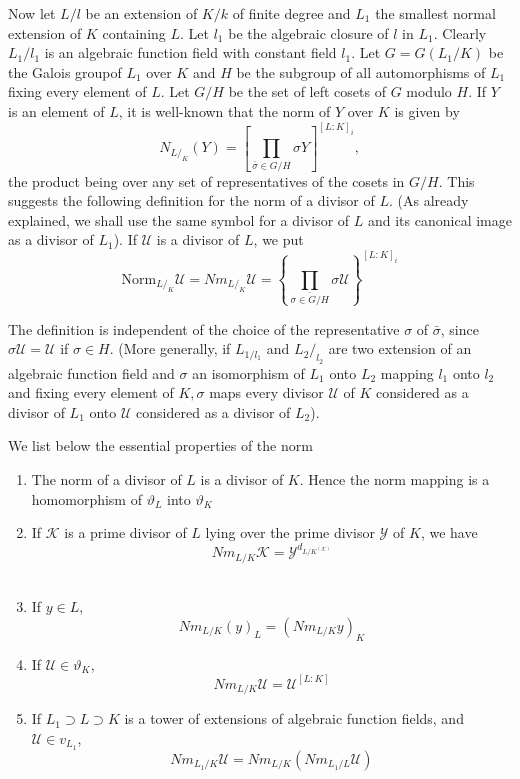 Now let $L/l$ be an extension of $K/ k$ of finite degree and $L_1$
the smallest normal extension of $K$ containing $L$. Let $l_1$ be the
algebraic closure of $l$ in $L_1$. Clearly  $L_1 / l_1$ is an
algebraic function field with constant field $l_1$. Let $G= G(L_1/K)$
be the Galois group\pageoriginale of $L_1$ over $K$ and $H$ be the subgroup of all
automorphisms of $L_1$ fixing every element of $L$. Let $G/H$ be the
set of left cosets of $G$ modulo $H$. If $Y$ is an element of $L$, it
is well-known that the norm of $Y$ over $K$ is given by 
$$
N_{L / _K}(Y) = \left[ \prod_{\bar{\sigma} \in G/ H} \sigma Y
  \right]^{[L : K]_i}, 
$$
the product being over any set of representatives of the cosets in $G
/H$. This suggests the following definition for the norm of a divisor
of $L$. (As already explained, we shall use the same symbol for a
divisor of $L$ and its canonical image as a divisor of $L_1$).  If
$\mathscr{U}$ is a divisor of $L$, we put  
$$
\text{Norm}_{L /_K} \mathscr{U} =Nm_{L / _K}\mathscr{U} =
\left\{\prod_{\bar{\sigma \in G/ H}} \sigma \mathscr{U} \right\}^{[L :K]_i} 
$$

The definition is independent of the choice of the representative
$\sigma$ of $\bar{\sigma}$, since $\sigma \mathscr{U}= \mathscr{U}$ if
$\sigma \in H$. (More generally, if  $L_{1/ l_1}$ and $L_2 /_{l_2}$
are two extension of an algebraic function field and $\sigma$ an
isomorphism of $L_1$ onto $L_2$ mapping $l_1$ onto $l_2$ and fixing
every element of $K, \sigma$ maps every divisor $\mathscr{U}$ of $K$
considered as a divisor of $L_1$ onto $\mathscr{U}$ considered as a
divisor of $L_2$). 

We list below the essential properties of the norm 
\begin{enumerate}
\item The norm of a divisor of $L$ is a divisor of $K$. Hence the norm
  mapping is a homomorphism of $\vartheta_L$ into $\vartheta_K$  
\item If $\mathscr{K}$ is a prime divisor of $L$ lying over the prime
  divisor $\mathscr{Y}$ of $K$, we have  
  $$
  Nm_{L /K}\mathscr{K} = \mathscr{Y}^{d_{L/ K ^{(\mathscr{K})}}}
  $$\pageoriginale\
\item If $y \in L$,
  $$
  Nm_{L/ K}(y)_L = (Nm_{L /K} y)_K
  $$
\item If $\mathscr{U} \in \vartheta_K$,
  $$
  Nm_{L /K}\mathscr{U}= \mathscr{U}^{[L : K]}
  $$
\item If $L_1 \supset L \supset K$ is a tower of extensions of
  algebraic function  fields, and $\mathscr{U} \in   v_{L_1}$, 
  $$
  Nm_{L_1 /K}\mathscr{U} =Nm_{L /K}(Nm_{L_1 / L}\mathscr{U})
  $$
\end{enumerate}

